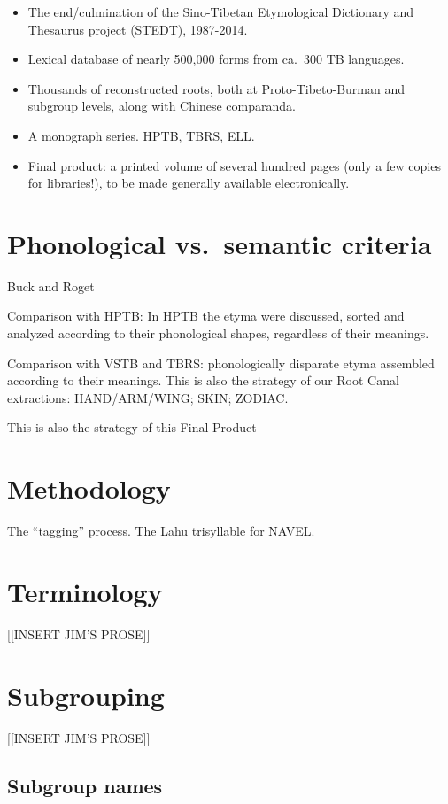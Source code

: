 \begin{itemize}
\item The end/culmination of the Sino-Tibetan Etymological Dictionary and Thesaurus project (STEDT), 1987-2014.
\item Lexical database of nearly 500,000 forms from ca.\ 300 TB languages.
\item Thousands of reconstructed roots, both at Proto-Tibeto-Burman and subgroup levels, along with Chinese comparanda.
\item A monograph series. HPTB, TBRS, ELL.
\item Final product: a printed volume of several hundred pages (only a few copies for libraries!), to be made generally available electronically.
\end{itemize}

\section{Phonological vs.\ semantic criteria}

Buck and Roget

Comparison with HPTB: In HPTB the etyma were discussed, sorted and analyzed according to their phonological shapes, regardless of their meanings.

Comparison with VSTB and TBRS: phonologically disparate etyma assembled according to their meanings. This is also the strategy of our Root Canal extractions:
HAND/ARM/WING; SKIN; ZODIAC.

This is also the strategy of this Final Product

\section{Methodology}
The ``tagging'' process. The Lahu trisyllable for NAVEL.

\section{Terminology}

[[INSERT JIM'S PROSE]]

\section{Subgrouping}

[[INSERT JIM'S PROSE]]

\subsection{Subgroup names}


